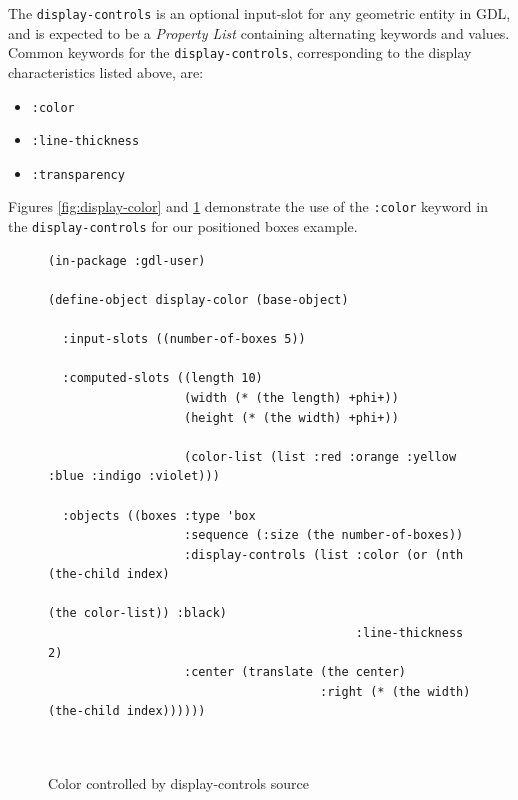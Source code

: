 \documentclass [11pt]{book}
\begin{document}
 The \texttt{display-controls} is an optional input-slot for any geometric entity in GDL,
and is expected to be a \emph{Property List} containing alternating keywords and values. Common keywords for the \texttt{display-controls}, corresponding to the display characteristics listed above, are: 

\begin{itemize}

\item \texttt{:color}

\item \texttt{:line-thickness}

\item \texttt{:transparency}

\end{itemize}

 Figures 
\ref{fig:display-color} and 
\ref{fig:display-color-source} demonstrate the use of the \texttt{:color} keyword in the \texttt{display-controls} for our positioned boxes example.

\begin{figure}\begin{lrbox}{\boxedverb}
\begin{minipage}{\linewidth}\begin{verbatim}(in-package :gdl-user)

(define-object display-color (base-object)
  
  :input-slots ((number-of-boxes 5))

  :computed-slots ((length 10)
                   (width (* (the length) +phi+))
                   (height (* (the width) +phi+))
                   
                   (color-list (list :red :orange :yellow :blue :indigo :violet)))

  :objects ((boxes :type 'box
                   :sequence (:size (the number-of-boxes))
                   :display-controls (list :color (or (nth (the-child index)
                                                           (the color-list)) :black)
                                           :line-thickness 2)
                   :center (translate (the center) 
                                      :right (* (the width) (the-child index))))))
            
                 

\end{verbatim}\end{minipage}
\end{lrbox}
\fbox{\usebox{\boxedverb}}

\caption{Color controlled by display-controls source}

\label{fig:display-color-source}

\end{figure}
\end{document}
